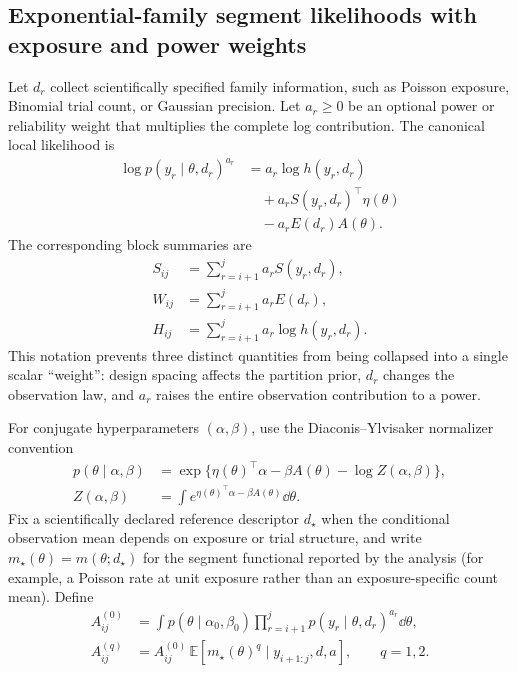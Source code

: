 \subsection{Exponential-family segment likelihoods with exposure and power weights}
Let $d_r$ collect scientifically specified family information, such as Poisson exposure, Binomial trial count, or Gaussian precision. Let $a_r\ge0$ be an optional power or reliability weight that multiplies the complete log contribution. The canonical local likelihood is
\begin{equation}
\begin{aligned}
\log p(y_r\mid\theta,d_r)^{a_r}
&=a_r\log h(y_r,d_r)\\
&\quad+a_rS(y_r,d_r)^\top\eta(\theta)\\
&\quad-a_rE(d_r)A(\theta).
\end{aligned}
\label{eq:local-ef}
\end{equation}
The corresponding block summaries are
\begin{align}
S_{ij}&=\sum_{r=i+1}^{j}a_rS(y_r,d_r),\nonumber\\
W_{ij}&=\sum_{r=i+1}^{j}a_rE(d_r),\nonumber\\
H_{ij}&=\sum_{r=i+1}^{j}a_r\log h(y_r,d_r).
\label{eq:block-summaries}
\end{align}
This notation prevents three distinct quantities from being collapsed into a single scalar ``weight'': design spacing affects the partition prior, $d_r$ changes the observation law, and $a_r$ raises the entire observation contribution to a power.

For conjugate hyperparameters $(\alpha,\beta)$, use the Diaconis--Ylvisaker normalizer convention
\begin{align}
p(\theta\mid\alpha,\beta)
&=\exp\{\eta(\theta)^\top\alpha-\beta A(\theta)-\log Z(\alpha,\beta)\},\nonumber\\
Z(\alpha,\beta)
&=\int e^{\eta(\theta)^\top\alpha-\beta A(\theta)}\dd\theta.
\label{eq:conjugate-prior}
\end{align}
Fix a scientifically declared reference descriptor $d_\star$ when the conditional observation mean depends on exposure or trial structure, and write $m_\star(\theta)=m(\theta;d_\star)$ for the segment functional reported by the analysis (for example, a Poisson rate at unit exposure rather than an exposure-specific count mean). Define
\begin{align*}
A^{(0)}_{ij}&=\int p(\theta\mid\alpha_0,\beta_0)
\prod_{r=i+1}^{j}p(y_r\mid\theta,d_r)^{a_r}\dd\theta,\\
A^{(q)}_{ij}&=A^{(0)}_{ij}\,\mathbb E[m_\star(\theta)^q\mid y_{i+1:j},d,a],\qquad q=1,2.
\end{align*}

